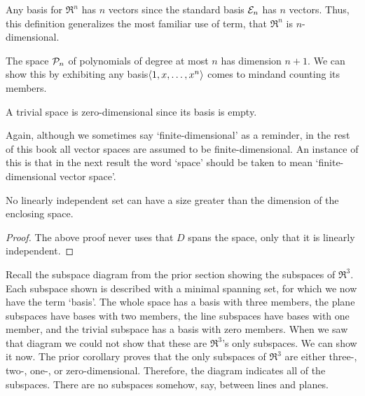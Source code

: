 \begin{example}
Any basis for \( \Re^n \) has \( n \) vectors since the standard basis 
\( {\cal E}_n \) has \( n \) vectors.
Thus, this definition generalizes the most familiar use of 
term, that $\Re^n$ is $n$-dimensional.
\end{example}

\begin{example}
The space \( \mathcal{P}_n \) of polynomials of degree at most $n$ 
has dimension \( n+1 \).
We can show this by exhibiting any basis\Dash $\langle1,x,\dots,x^n\rangle$ 
comes to mind\Dash and counting its members.
\end{example}

\begin{example}
A trivial space is zero-dimensional since its basis is empty.
\end{example}

Again, although we sometimes say `finite-dimensional' as a reminder, in the
rest of this book all vector spaces are assumed to be finite-dimensional.
An instance of this is that in the next result the word `space' should be 
taken to mean `finite-dimensional vector space'.

\begin{corollary}
\label{cor:NoLiSetGreatDim}
No linearly independent set can have a size greater than the dimension of the
enclosing space.
\end{corollary}

\begin{proof}
The above proof never uses that \( D \) spans the space,
only that it is linearly independent.
\end{proof}

\begin{example} \label{ex:RefSubSpDiagram}
Recall the subspace diagram from the prior section showing 
the subspaces of \( \Re^3 \).
Each subspace shown is described with a minimal spanning set, for which we
now have the term `basis'.
The whole space has a basis with three members, 
the plane subspaces have bases with two members,
the line subspaces have bases with one member, 
and the trivial subspace has a basis with zero members.
When we saw that diagram we could not show that these are 
\( \Re^3 \)'s only subspaces.
We can show it now.
The prior corollary proves that 
the only subspaces of \( \Re^3 \) are either three-\hbox{},
two-\hbox{}, one-\hbox{}, or zero-dimensional.
Therefore, the diagram indicates all of the subspaces.
There are no subspaces somehow, say, between lines and planes.
\end{example}

